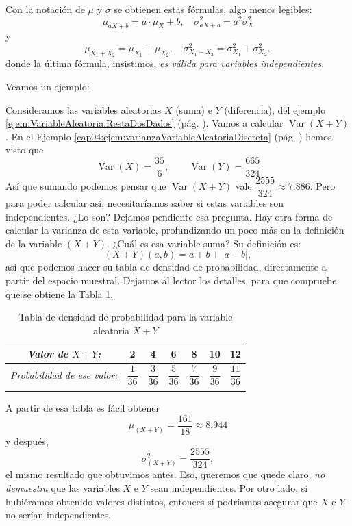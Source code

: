 Con la notación de $\mu$ y $\sigma$ se obtienen estas fórmulas, algo menos legibles:
    \[\mu_{aX+b}=a\cdot\mu_X + b,\quad \sigma^2_{aX+b}=a^2\sigma^2_X\]
y
\[\mu_{X_1+X_2}=\mu_{X_1}+\mu_{X_2},\quad \sigma^2_{X_1+X_2}=\sigma^2_{X_1}+\sigma^2_{X_2},\]
donde la última fórmula, insistimos, {\em es válida para variables independientes}.

Veamos un ejemplo:
\begin{Ejemplo}
\label{cap04:ejem:varianzaSumaVariablesAleatoriasDiscretas}
Consideramos las variables aleatorias $X$ (suma) e $Y$ (diferencia), del ejemplo \ref{ejem:VariableAleatoria:RestaDosDados} (pág. \pageref{ejem:VariableAleatoria:RestaDosDados}). Vamos a calcular $\operatorname{Var}(X+Y)$. En el Ejemplo \ref{cap04:ejem:varianzaVariableAleatoriaDiscreta} (pág. \pageref{cap04:ejem:varianzaVariableAleatoriaDiscreta}) hemos visto que \[\operatorname{Var}(X)=\dfrac{35}{6},\qquad \operatorname{Var}(Y)=\dfrac{665}{324}\]
Así que sumando podemos pensar que $\operatorname{Var}(X+Y)$ vale $\dfrac{2555}{324}\approx 7.886$. Pero para poder calcular así, necesitaríamos saber si estas variables son independientes. ¿Lo son?
Dejamos pendiente esa pregunta. Hay otra forma de calcular la varianza de esta variable, profundizando un poco más en la definición de la variable $(X+Y)$. ¿Cuál es esa variable suma? Su definición es:
\[(X + Y)(a,b)=a+b+|a-b|,\]
así que podemos hacer su tabla de densidad de probabilidad, directamente a partir del espacio muestral. Dejamos al lector los detalles, para que compruebe que se obtiene la Tabla \ref{cap04:tabla:VariableAleatoriaXmasY}.
    \begin{table}[ht]
    \begin{center}
    \begin{tabular}[t]{|c|c|c|c|c|c|c|}
    \hline
    \rule{0cm}{0.5cm}{\em Valor de $X+Y$:}&2&4&6&8&10&12\\
    \hline
    \rule{0cm}{0.7cm}{\em Probabilidad de ese valor:}&$\dfrac{1}{36}$&$\dfrac{3}{36}$&$\dfrac{5}{36}$&$\dfrac{7}{36}$&$\dfrac{9}{36}$&$\dfrac{11}{36}$\\
    &&&&&&\\
    \hline
    \end{tabular}
    \end{center}
    \caption{Tabla de densidad de probabilidad para la variable aleatoria $X+Y$}\label{cap04:tabla:VariableAleatoriaXmasY}
    \end{table}
A partir de esa tabla es fácil obtener
\[\mu_{(X+Y)}=\dfrac{161}{18}\approx 8.944\]
y después,
\[\sigma^2_{(X+Y)}=\dfrac{2555}{324},\]
el mismo resultado que obtuvimos antes. Eso, queremos que quede claro, {\sf\em no demuestra} que las variables $X$ e $Y$ sean independientes. Por otro lado, si hubiéramos obtenido valores distintos, entonces sí podríamos asegurar que $X$ e $Y$ no serían independientes.


\end{Ejemplo}
